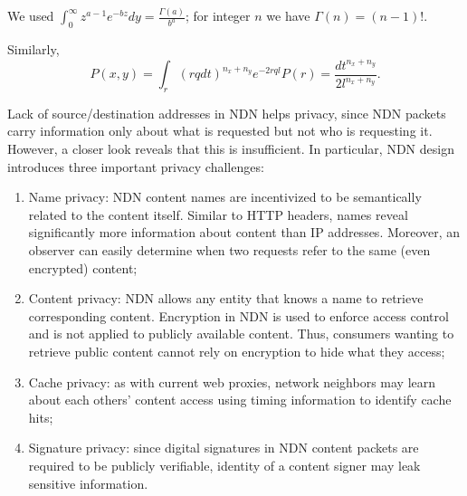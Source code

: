 \documentclass[12pt]{spieman}
\begin{document}
\begin{spacing}{2}
We used $\int_{0}^{\infty} z^{a-1} e^{-bz} dy = \frac{\Gamma(a)}{b^a}$; for integer $n$ we have $\Gamma(n) = (n - 1)!$.

Similarly,
\begin{equation}
\label{3}
P(x,y) = \int_{r}^{} (rq dt)^{n_{x}+n_{y}} e^{-2rql} P(r) = \frac{dt^{n_{x}+n_{y}}}{2l^{n_{x}+n_{y}}}.
\end{equation}

Lack of source/destination addresses in NDN helps privacy, since NDN packets carry information only about what is requested but not who is requesting it. However, a closer look reveals that this is insufficient. In particular, NDN design introduces three important privacy challenges: 

\begin{enumerate}
\item Name privacy: NDN content names are incentivized to be semantically related to the content itself. Similar to HTTP headers, names reveal significantly more information about content than IP addresses. Moreover, an observer can easily determine when two requests refer to the same (even encrypted) content;
\item Content privacy: NDN allows any entity that knows a name to retrieve corresponding content. Encryption in NDN is used to enforce access control and is not applied to publicly available content. Thus, consumers wanting to retrieve public content cannot rely on encryption to hide what they access;
\item Cache privacy: as with current web proxies, network neighbors may learn about each others’ content access using timing information to identify cache hits;
\item Signature privacy: since digital signatures in NDN content packets are required to be publicly verifiable, identity of a content signer may leak sensitive information.
\end{enumerate}

\end{spacing}
\end{document}
